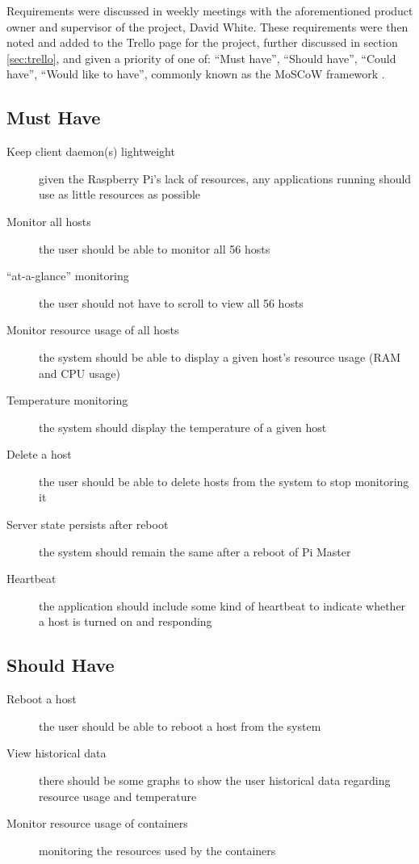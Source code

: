 \label{sec:reqs}
Requirements were discussed in weekly meetings with the aforementioned product owner and supervisor of the project, David White.
These requirements were then noted and added to the Trello page for the project, further discussed in section \ref{sec:trello}, and given a priority of one of: ``Must have'', ``Should have'', ``Could have'', ``Would like to have'', commonly known as the MoSCoW framework \citep{moscow}.

\subsection{Must Have}
\label{sec:musthave}
\begin{description}
	\item[Keep client daemon(s) lightweight] given the Raspberry Pi's lack of resources, any applications running should use as little resources as possible
	\item[Monitor all hosts] the user should be able to monitor all 56 hosts
	\item[``at-a-glance'' monitoring] the user should not have to scroll to view all 56 hosts
	\item[Monitor resource usage of all hosts] the system should be able to display a given host's resource usage (RAM and CPU usage)
	\item[Temperature monitoring] the system should display the temperature of a given host
	\item[Delete a host] the user should be able to delete hosts from the system to stop monitoring it
	\item[Server state persists after reboot] the system should remain the same after a reboot of Pi Master
	\item[Heartbeat] the application should include some kind of heartbeat to indicate whether a host is turned on and responding
\end{description}

\subsection{Should Have}
\label{sec:shouldhave}
\begin{description}
	\item[Reboot a host] the user should be able to reboot a host from the system
	\item[View historical data] there should be some graphs to show the user historical data regarding resource usage and temperature
	\item[Monitor resource usage of containers] monitoring the resources used by the containers
\end{description}


